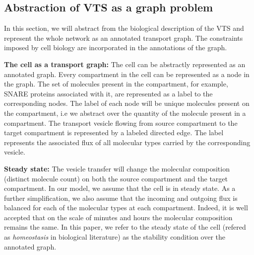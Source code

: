 %

\subsection{Abstraction of VTS as a graph problem}


In this section, we will abstract from the biological description of the VTS and represent the whole network as an annotated transport graph. 
%
The constraints imposed by cell biology are incorporated in the  annotations of the graph. 

\textbf{The cell as a transport graph:} 
The cell can be abstractly represented as an annotated graph. 
Every compartment in the cell can be represented as a node in the graph. 
%
The set of molecules present in the compartment, for example, SNARE proteins associated with it, are represented as a label to the corresponding nodes.
%
The label of each node will be unique molecules present on the compartment, i.e we abstract over the quantity of the molecule present in a compartment.
%
The transport vesicle flowing from source compartment to the target compartment is represented by a labeled directed edge. 
% 
The label represents the associated flux of all molecular types carried by the corresponding vesicle.
%
%

\textbf{Steady state:} 
The vesicle transfer will change the molecular composition (distinct molecule count) on both the source compartment and the target compartment. 
%
In our model, we assume that the cell is in steady state. As a further simplification, we also assume that the incoming and outgoing flux is balanced for each of the molecular types at each compartment. 
Indeed, it is well accepted that on the scale of minutes and hours the molecular composition remains the same. 
%
In this paper, we refer to the steady state of the cell (refered as \textit{homeostasis} in biological literature) as the stability condition over the annotated graph.


